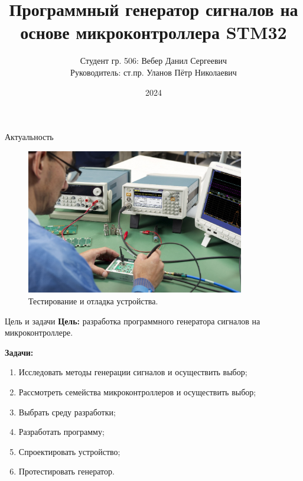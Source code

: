 \documentclass[10pt]{beamer}
\begin{document}
\title{Программный генератор сигналов на основе микроконтроллера STM32}
\author{Студент гр. 506: Вебер Данил Сергеевич\\Руководитель:  ст.пр. Уланов Пётр Николаевич}
\date{2024}


\frame{\titlepage}

\begin{frame}{Актуальность}
  
  \begin{figure}
  \includegraphics[width=0.85\textwidth]{actual2}
  \caption*{Тестирование и отладка устройства.}
  \end{figure}
\end{frame}

\begin{frame}{Цель и задачи}
  \textbf{Цель:} разработка программного генератора сигналов на микроконтроллере.

  \textbf{Задачи:} 
	\begin{enumerate}
		\item Исследовать методы генерации сигналов и осуществить выбор;
		\item Рассмотреть семейства микроконтроллеров и осуществить выбор;
		\item Выбрать среду разработки;
		\item Разработать программу;
		\item Спроектировать устройство;
		\item Протестировать генератор.
	\end{enumerate}
\end{frame}
\end{document}
